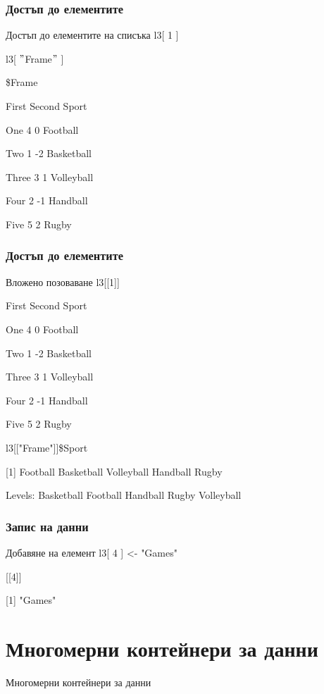 \documentclass{beamer}
\begin{document}
\begin{frame}
\frametitle{Достъп до елементите}
\begin{block}{Достъп до елементите на списъка}
l3[ 1 ]

l3[ $"$Frame$"$ ]

\$Frame

      First Second      Sport

One       4      0   Football

Two       1     -2 Basketball

Three     3      1 Volleyball

Four      2     -1   Handball

Five      5      2      Rugby

\end{block}
\end{frame}

\begin{frame}
\frametitle{Достъп до елементите}
\begin{block}{Вложено позоваване}
l3[[1]]

      First Second      Sport

One       4      0   Football

Two       1     -2 Basketball

Three     3      1 Volleyball

Four      2     -1   Handball

Five      5      2      Rugby

l3[["Frame"]]\$Sport

[1] Football   Basketball Volleyball Handball   Rugby     

Levels: Basketball Football Handball Rugby Volleyball
\end{block}
\end{frame}

\begin{frame}
\frametitle{Запис на данни}
\begin{block}{Добавяне на елемент}
l3[ 4 ] <- "Games"

[[4]]

[1] "Games"
\end{block}
\end{frame}

\section{Многомерни контейнери за данни}

\begin{frame}
\center \huge{Многомерни контейнери за данни}
\end{frame}
\end{document}
